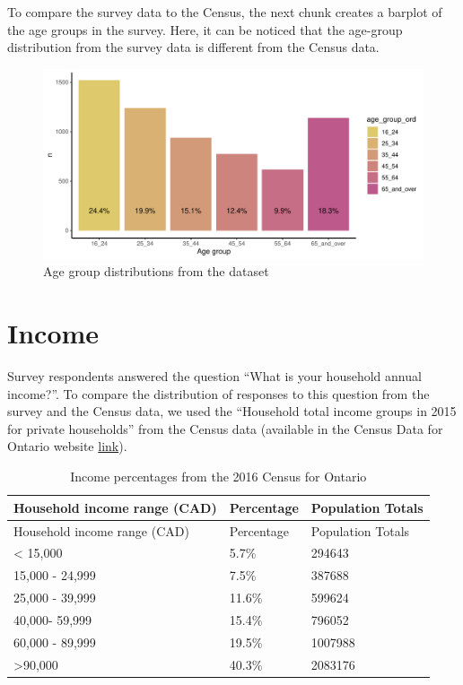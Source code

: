 \documentclass[
  letterpaper,
  DIV=11,
  numbers=noendperiod]{scrartcl}
\begin{document}
To compare the survey data to the Census, the next chunk creates a
barplot of the age groups in the survey. Here, it can be noticed that
the age-group distribution from the survey data is different from the
Census data.

\begin{figure}

{\centering \includegraphics{appendix_files/figure-pdf/trends-by-age-1.pdf}

}

\caption{Age group distributions from the dataset}

\end{figure}

\hypertarget{income}{%
\section{Income}\label{income}}

Survey respondents answered the question ``What is your household annual
income?''. To compare the distribution of responses to this question
from the survey and the Census data, we used the ``Household total
income groups in 2015 for private households'' from the Census data
(available in the Census Data for Ontario website
\href{https://www12.statcan.gc.ca/census-recensement/2016/dp-pd/prof/details/page.cfm?Lang=E\&Geo1=PR\&Code1=35\&Geo2=PR\&Code2=01\&SearchText=Ontario\&SearchType=Begins\&SearchPR=01\&B1=Income\&TABID=1\&type=1}{link}).

\begin{longtable}[]{@{}lll@{}}
\caption{Income percentages from the 2016 Census for
Ontario}\tabularnewline
\toprule\noalign{}
Household income range (CAD) & Percentage & Population Totals \\
\midrule\noalign{}
\endfirsthead
\toprule\noalign{}
Household income range (CAD) & Percentage & Population Totals \\
\midrule\noalign{}
\endhead
\bottomrule\noalign{}
\endlastfoot
\textless{} 15,000 & 5.7\% & 294643 \\
15,000 - 24,999 & 7.5\% & 387688 \\
25,000 - 39,999 & 11.6\% & 599624 \\
40,000- 59,999 & 15.4\% & 796052 \\
60,000 - 89,999 & 19.5\% & 1007988 \\
\textgreater90,000 & 40.3\% & 2083176 \\
\end{longtable}
\end{document}
